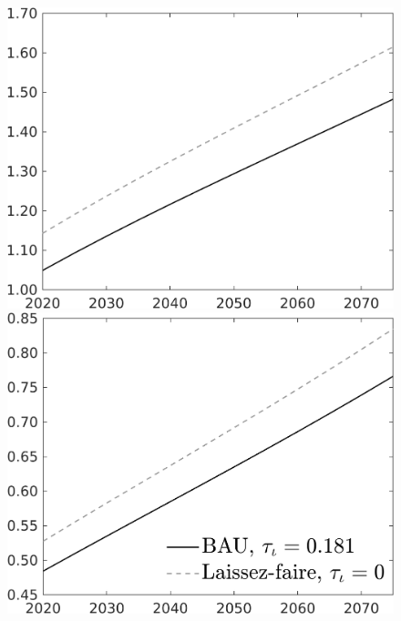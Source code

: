 \documentclass[12pt]{article}
\begin{document}
\begin{figure}[h!!]
\begin{minipage}[]{0.32\textwidth}
	\end{minipage}	
	\begin{minipage}[]{0.32\textwidth}
		\includegraphics[width=1\textwidth]{../../codding_model/own_basedOnFried/optimalPol_010922_revision/figures/all_13Sept22/CompTaul_Equlab_LFBAU_Reg0_C_spillover0_nsk1_xgr1_knspil1_sep1_countec0_GovRev0_etaa0.79_lgd0.png}
	\end{minipage}	
	\begin{minipage}[]{0.32\textwidth}
		\includegraphics[width=1\textwidth]{../../codding_model/own_basedOnFried/optimalPol_010922_revision/figures/all_13Sept22/CompTaul_Equlab_LFBAU_Reg0_F_spillover0_nsk1_xgr1_knspil1_sep1_countec0_GovRev0_etaa0.79_lgd1.png}

\end{minipage}
\end{figure}
\end{document}
